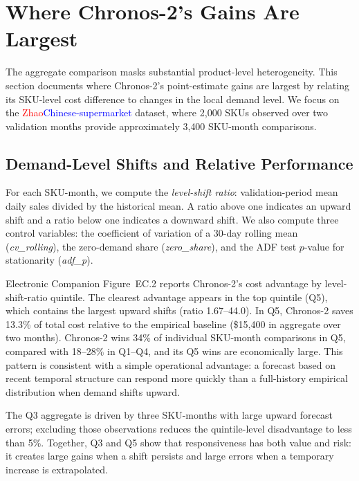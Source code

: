 \documentclass[msom,dblanonrev]{informs4}
\newcommand{\add}[1]{\textcolor{blue}{#1}}
\newcommand{\reduce}[1]{\textcolor{red}{#1}\hspace{0.5em}}
\begin{document}
\section{Where Chronos-2's Gains Are Largest}\label{sec:mechanism}

The aggregate comparison masks substantial product-level heterogeneity.
This section documents where Chronos-2's point-estimate gains are largest by relating its SKU-level cost difference to changes in the local demand level.
We focus on the \reduce{Zhao}\add{Chinese-supermarket} dataset, where 2{,}000 SKUs observed over two validation months provide approximately 3{,}400 SKU-month comparisons.

\subsection{Demand-Level Shifts and Relative Performance}

For each SKU-month, we compute the \emph{level-shift ratio}: validation-period mean daily sales divided by the historical mean.
A ratio above one indicates an upward shift and a ratio below one indicates a downward shift.
We also compute three control variables: the coefficient of variation of a 30-day rolling mean (\emph{cv\_rolling}), the zero-demand share (\emph{zero\_share}), and the ADF test $p$-value for stationarity (\emph{adf\_p}).

Electronic Companion Figure~EC.2 reports Chronos-2's cost advantage by level-shift-ratio quintile.
The clearest advantage appears in the top quintile (Q5), which contains the largest upward shifts (ratio 1.67--44.0).
In Q5, Chronos-2 saves 13.3\% of total cost relative to the empirical baseline (\$15{,}400 in aggregate over two months).
Chronos-2 wins 34\% of individual SKU-month comparisons in Q5, compared with 18--28\% in Q1--Q4, and its Q5 wins are economically large.
This pattern is consistent with a simple operational advantage: a forecast based on recent temporal structure can respond more quickly than a full-history empirical distribution when demand shifts upward.

The Q3 aggregate is driven by three SKU-months with large upward forecast errors; excluding those observations reduces the quintile-level disadvantage to less than 5\%.
Together, Q3 and Q5 show that responsiveness has both value and risk: it creates large gains when a shift persists and large errors when a temporary increase is extrapolated.
\end{document}
